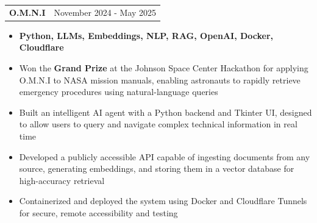 \documentclass[letterpaper,11pt]{article}
\makeatletter
\newcommand{\resumeItem}[1]{
  \item\small{
    {#1 \vspace{-2pt}}
  }
}
\newcommand{\resumeProjectHeading}[2]{
    \item
    \begin{tabular*}{0.97\textwidth}{l@{\extracolsep{\fill}}r}
      \small#1 & #2 \\
    \end{tabular*}\vspace{-8pt}
}
\newcommand{\resumeItemListStart}{\begin{itemize}}
\newcommand{\resumeItemListEnd}{\end{itemize}\vspace{-6pt}}
\makeatother
\begin{document}
\resumeProjectHeading
{\textbf{O.M.N.I}}{November 2024 - May 2025}
\resumeItemListStart
\resumeItem{ \textbf{Python, LLMs, Embeddings, NLP, RAG, OpenAI, Docker, Cloudflare}}
\resumeItem{Won the \textbf{Grand Prize} at the Johnson Space Center Hackathon for applying O.M.N.I to NASA mission manuals, enabling astronauts to rapidly retrieve emergency procedures using natural-language queries}
\resumeItem{Built an intelligent AI agent with a Python backend and Tkinter UI, designed to allow users to query and navigate complex technical information in real time}
\resumeItem{Developed a publicly accessible API capable of ingesting documents from any source, generating embeddings, and storing them in a vector database for high-accuracy retrieval}
\resumeItem{Containerized and deployed the system using Docker and Cloudflare Tunnels for secure, remote accessibility and testing}
\resumeItemListEnd \vspace{-5pt}


\end{document}

